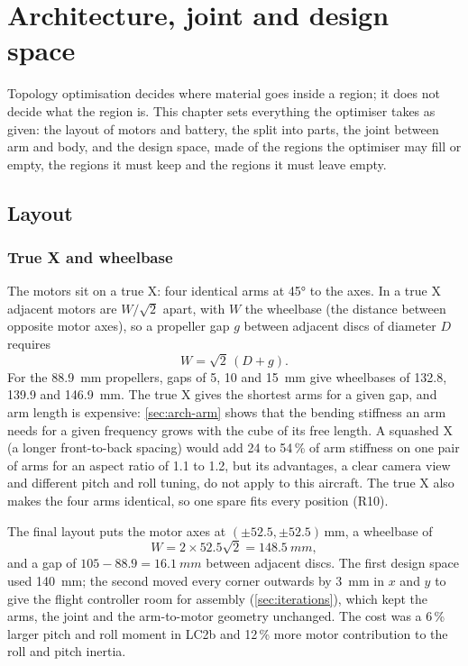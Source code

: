 \chapter{Architecture, joint and design space}\label{sec:architecture}

Topology optimisation decides where material goes inside a region; it does not decide what the region is. This chapter sets everything the optimiser takes as given: the layout of motors and battery, the split into parts, the joint between arm and body, and the design space, made of the regions the optimiser may fill or empty, the regions it must keep and the regions it must leave empty.

\section{Layout}\label{sec:arch-layout}

\subsection{True X and wheelbase}

The motors sit on a true X: four identical arms at \ang{45} to the axes. In a true X adjacent motors are $W/\sqrt2$ apart, with $W$ the wheelbase (the distance between opposite motor axes), so a propeller gap $g$ between adjacent discs of diameter $D$ requires
\begin{equation}
W = \sqrt2\,(D + g).
\end{equation}
For the \SI{88.9}{mm} propellers, gaps of 5, 10 and \SI{15}{mm} give wheelbases of 132.8, 139.9 and \SI{146.9}{mm}. The true X gives the shortest arms for a given gap, and arm length is expensive: \cref{sec:arch-arm} shows that the bending stiffness an arm needs for a given frequency grows with the cube of its free length. A squashed X (a longer front-to-back spacing) would add 24 to 54\,\% of arm stiffness on one pair of arms for an aspect ratio of 1.1 to 1.2, but its advantages, a clear camera view and different pitch and roll tuning, do not apply to this aircraft. The true X also makes the four arms identical, so one spare fits every position (R10).

The final layout puts the motor axes at $(\pm52.5, \pm52.5)$\,mm, a wheelbase of
\begin{equation}
W = 2 \times 52.5\sqrt2 = \SI{148.5}{mm},
\end{equation}
and a gap of $105 - 88.9 = \SI{16.1}{mm}$ between adjacent discs. The first design space used \SI{140}{mm}; the second moved every corner outwards by \SI{3}{mm} in $x$ and $y$ to give the flight controller room for assembly (\cref{sec:iterations}), which kept the arms, the joint and the arm-to-motor geometry unchanged. The cost was a 6\,\% larger pitch and roll moment in LC2b and 12\,\% more motor contribution to the roll and pitch inertia.

